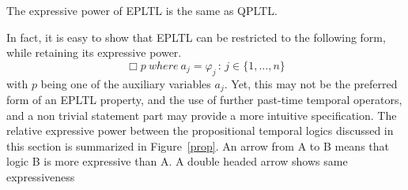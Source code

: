\begin{lemma}
\label{simplecase}
The expressive power of 
EPLTL is the same as QPLTL.
\end{lemma}
In fact, it is easy to show that EPLTL can be restricted to the following form, while retaining its expressive power.
\[  \Box p {\ where\ } a_j  = \varphi_j \, : \, 
{j \in \{1, \ldots , n\}}  \] 
with $p$ being one of the auxiliary variables $a_j$. Yet, this may not be the preferred form
of an EPLTL property, and the use of further past-time temporal operators, and a non trivial statement  part may provide a more intuitive specification.
The relative expressive power between the propositional temporal logics discussed in this section is summarized in Figure~\ref{prop}. An arrow from A to B means that logic  B is more expressive than A. A double headed arrow shows same expressiveness

